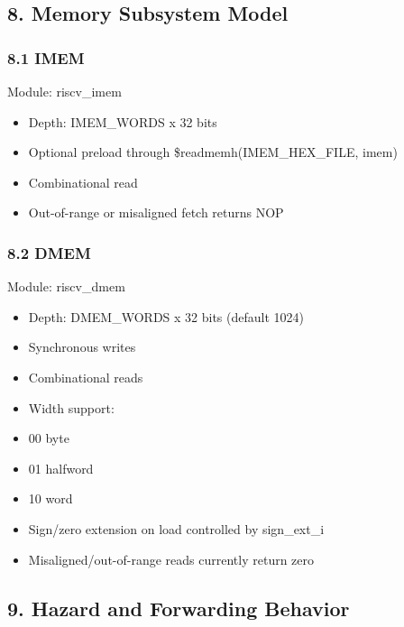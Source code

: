 \documentclass[]{article}
\providecommand{\tightlist}{%
  \setlength{\itemsep}{0pt}\setlength{\parskip}{0pt}}
\begin{document}
\hypertarget{8-memory-subsystem-model}{%
\subsection{8. Memory Subsystem Model}\label{8-memory-subsystem-model}}

\hypertarget{81-imem}{%
\subsubsection{8.1 IMEM}\label{81-imem}}

Module: riscv\_imem

\begin{itemize}
\tightlist
\item
  Depth: IMEM\_WORDS x 32 bits
\item
  Optional preload through \$readmemh(IMEM\_HEX\_FILE, imem)
\item
  Combinational read
\item
  Out-of-range or misaligned fetch returns NOP
\end{itemize}

\hypertarget{82-dmem}{%
\subsubsection{8.2 DMEM}\label{82-dmem}}

Module: riscv\_dmem

\begin{itemize}
\tightlist
\item
  Depth: DMEM\_WORDS x 32 bits (default 1024)
\item
  Synchronous writes
\item
  Combinational reads
\item
  Width support:
\item
  00 byte
\item
  01 halfword
\item
  10 word
\item
  Sign/zero extension on load controlled by sign\_ext\_i
\item
  Misaligned/out-of-range reads currently return zero
\end{itemize}

\hypertarget{9-hazard-and-forwarding-behavior}{%
\subsection{9. Hazard and Forwarding
Behavior}\label{9-hazard-and-forwarding-behavior}}
\end{document}
